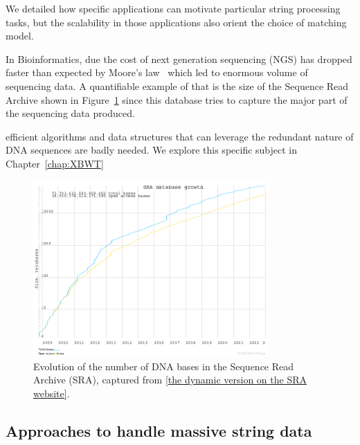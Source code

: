 We detailed how specific applications can motivate particular string processing tasks, but the scalability in those applications also orient the choice of matching model.


In Bioinformatics, due the cost of next generation sequencing (NGS) has dropped faster than expected by Moore's law~\cite{muir2016real} which led to enormous volume of sequencing data. A quantifiable example of that is the size of the Sequence Read Archive shown in Figure~\ref{fig:intro:sra} since this database tries to capture the major part of the sequencing data produced.


efficient algorithms and data structures that can leverage the redundant nature of DNA sequences are badly needed. We explore this specific subject in Chapter~\ref{chap:XBWT}

\begin{figure}
    \begin{center}
        \includegraphics[width=0.8\textwidth]{Introduction/sra_database_growth.png}
        \caption{Evolution of the number of DNA bases in the Sequence Read Archive (SRA), captured from \href{https://www.ncbi.nlm.nih.gov/sra/docs/sragrowth/}{[the dynamic version on the SRA website]}.}
        \label{fig:intro:sra}
    \end{center}
\end{figure}


\subsection*{Approaches to handle massive string data}

